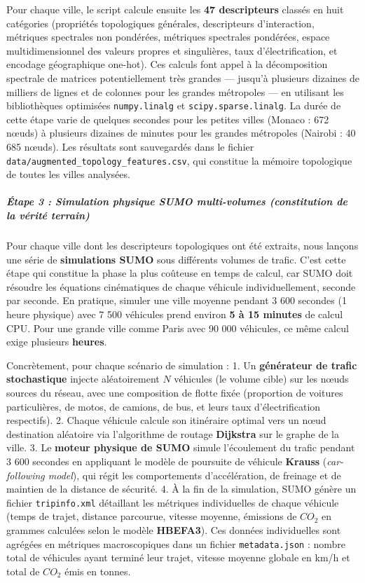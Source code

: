 \documentclass[10pt, a4paper]{article}
\begin{document}
Pour chaque ville, le script calcule ensuite les \textbf{47
descripteurs} classés en huit catégories (propriétés topologiques
générales, descripteurs d'interaction, métriques spectrales non
pondérées, métriques spectrales pondérées, espace multidimensionnel des
valeurs propres et singulières, taux d'électrification, et encodage
géographique one-hot). Ces calculs font appel à la décomposition
spectrale de matrices potentiellement très grandes --- jusqu'à plusieurs
dizaines de milliers de lignes et de colonnes pour les grandes
métropoles --- en utilisant les bibliothèques optimisées
\texttt{numpy.linalg} et \texttt{scipy.sparse.linalg}. La durée de cette
étape varie de quelques secondes pour les petites villes (Monaco : 672
nœuds) à plusieurs dizaines de minutes pour les grandes métropoles
(Nairobi : 40 685 nœuds). Les résultats sont sauvegardés dans le fichier
\texttt{data/augmented\_topology\_features.csv}, qui constitue la
mémoire topologique de toutes les villes analysées.

\subparagraph{Étape 3 : Simulation physique SUMO multi-volumes
(constitution de la vérité
terrain)}\label{uxe9tape-3-simulation-physique-sumo-multi-volumes-constitution-de-la-vuxe9rituxe9-terrain}

Pour chaque ville dont les descripteurs topologiques ont été extraits,
nous lançons une série de \textbf{simulations SUMO} sous différents
volumes de trafic. C'est cette étape qui constitue la phase la plus
coûteuse en temps de calcul, car SUMO doit résoudre les équations
cinématiques de chaque véhicule individuellement, seconde par seconde.
En pratique, simuler une ville moyenne pendant 3 600 secondes (1 heure
physique) avec 7 500 véhicules prend environ \textbf{5 à 15 minutes} de
calcul CPU. Pour une grande ville comme Paris avec 90 000 véhicules, ce
même calcul exige plusieurs \textbf{heures}.

Concrètement, pour chaque scénario de simulation : 1. Un
\textbf{générateur de trafic stochastique} injecte aléatoirement \(N\)
véhicules (le volume cible) sur les nœuds sources du réseau, avec une
composition de flotte fixée (proportion de voitures particulières, de
motos, de camions, de bus, et leurs taux d'électrification respectifs).
2. Chaque véhicule calcule son itinéraire optimal vers un nœud
destination aléatoire via l'algorithme de routage \textbf{Dijkstra} sur
le graphe de la ville. 3. Le \textbf{moteur physique de SUMO} simule
l'écoulement du trafic pendant 3 600 secondes en appliquant le modèle de
poursuite de véhicule \textbf{Krauss} (\emph{car-following model}), qui
régit les comportements d'accélération, de freinage et de maintien de la
distance de sécurité. 4. À la fin de la simulation, SUMO génère un
fichier \texttt{tripinfo.xml} détaillant les métriques individuelles de
chaque véhicule (temps de trajet, distance parcourue, vitesse moyenne,
émissions de \(CO_2\) en grammes calculées selon le modèle
\textbf{HBEFA3}). Ces données individuelles sont agrégées en métriques
macroscopiques dans un fichier \texttt{metadata.json} : nombre total de
véhicules ayant terminé leur trajet, vitesse moyenne globale en km/h et
total de \(CO_2\) émis en tonnes.
\end{document}

